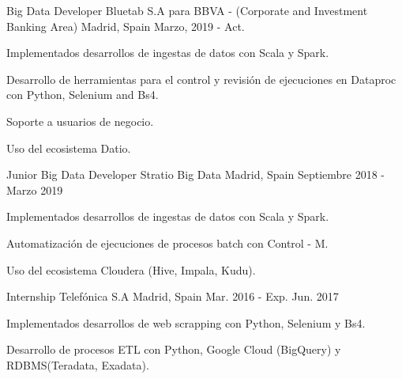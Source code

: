 

\begin{cventries}

  \cventry
    {Big Data Developer} %
    {Bluetab S.A para BBVA - (Corporate and Investment Banking Area)} %
    {Madrid, Spain} %
    {Marzo, 2019 - Act.} %
    {
      \begin{cvitems} %
        \item {Implementados desarrollos de ingestas de datos con Scala y Spark.}
        \item {Desarrollo de herramientas para el control y revisión de ejecuciones en Dataproc con Python, Selenium and Bs4.}
        \item {Soporte a usuarios de negocio.}
        \item {Uso del ecosistema Datio.}
      \end{cvitems}
    }

  \cventry
    {Junior Big Data Developer} %
    {Stratio Big Data} %
    {Madrid, Spain} %
    {Septiembre 2018 - Marzo 2019} %
    {
      \begin{cvitems} %
        \item {Implementados desarrollos de ingestas de datos con Scala y Spark.}
        \item {Automatización de ejecuciones de procesos batch con Control - M.}
        \item {Uso del ecosistema Cloudera (Hive, Impala, Kudu).}
      \end{cvitems}
    }

  \cventry
    {Internship} %
    {Telefónica S.A} %
    {Madrid, Spain} %
    {Mar. 2016 - Exp. Jun. 2017} %
    {
      \begin{cvitems} %
        \item {Implementados desarrollos de web scrapping con Python, Selenium y Bs4.}
        \item {Desarrollo de procesos ETL con Python, Google Cloud (BigQuery) y RDBMS(Teradata, Exadata).}
      \end{cvitems}
    }

\end{cventries}
